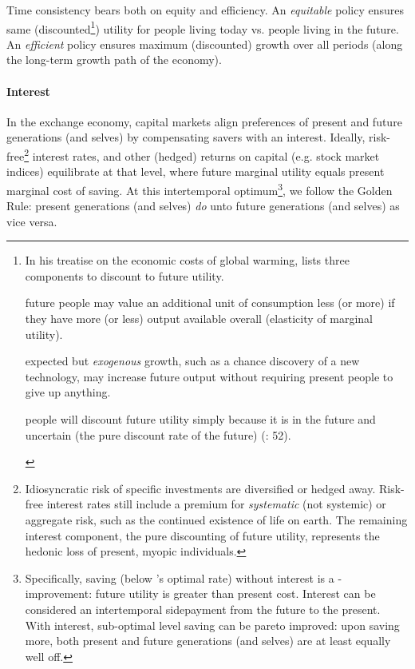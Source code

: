 Time consistency bears both on equity and efficiency. An \emph{equitable} policy ensures same (discounted\footnote{
	\label{fn:3components}In his treatise on the economic costs of global warming, \citeauthor{Stern-2006-aa} lists three components to discount to future utility. \begin{inparaenum}[\itshape 1\upshape)] 
		\item future people may value an additional unit of consumption less (or more) if they have more (or less) output available overall (elasticity of marginal utility). 
		\item expected but \emph{exogenous} growth, such as a chance discovery of a new technology, may increase future output without requiring present people to give up anything. 
		\item people will discount future utility simply because it is in the future and uncertain (the pure discount rate of the future) (\citeyear{Stern-2006-aa}: 52).
	\end{inparaenum}})
utility for people living today vs. people living in the future. An \emph{efficient} policy ensures maximum (discounted) growth over all periods (along the long-term growth path of the economy). %


\paragraph{Interest}  \label{sec:interest} In the exchange economy, capital markets align preferences of present and future generations (and selves) by compensating savers with an interest. Ideally, risk-free\footnote{
	Idiosyncratic risk of specific investments are diversified or hedged away. Risk-free interest rates still include a premium for \emph{systematic} (not systemic) or aggregate risk, such as the continued existence of life on earth. The remaining interest component, the pure discounting of future utility, represents the hedonic loss of present, myopic individuals.} 
interest rates, and other (hedged) returns on capital (e.g. stock market indices) equilibrate at that level, where future marginal utility equals present marginal cost of saving. At this intertemporal optimum\footnote{
	Specifically, saving (below \citeauthor{Solow1956}'s optimal rate) without interest is a \citeauthor{Kaldor1939}-\citeauthor{Hicks1939} improvement: future utility is greater than present cost. Interest can be considered an intertemporal sidepayment from the future to the present. With interest, sub-optimal level saving can be pareto improved: upon saving more, both present and future generations (and selves) are at least equally well off.}, 
we follow the Golden Rule: present generations (and selves) \emph{do} unto future generations (and selves) as vice versa. 

